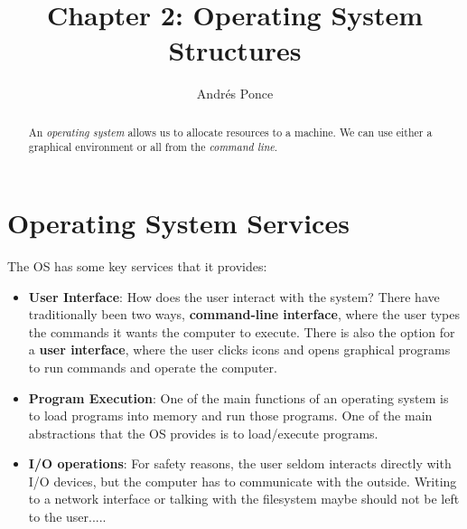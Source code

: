 \documentclass{tufte-handout}
\title{Chapter 2: Operating System Structures}
\author{Andr\'es Ponce}
\begin{document}
\maketitle
\begin{abstract}
	An \textit{operating system} allows us to allocate resources
	to a machine. We can use either a graphical environment or 
	all from the \textit{command line}.
\end{abstract}


\section{Operating System Services}
The OS has some key services that it provides:

\begin{itemize}
	\item \textbf{User Interface}: How does the user interact with the system? There 
			have traditionally been two ways, \textbf{command-line interface}, where the 
			user types the commands it wants the computer to execute. There is also the 
			option for a \textbf{user interface}, where the user clicks icons and opens
			graphical programs to run commands and operate the computer.

	\item \textbf{Program Execution}: One of the main functions of an operating system 
			is to load programs into memory and run those programs. One of the main 
			abstractions that the OS provides is to load/execute programs.

	\item \textbf{I/O operations}: For safety reasons, the user seldom interacts directly
			with I/O devices, but the computer has to communicate with the outside. 
			Writing to a network interface or talking with the filesystem maybe should not
			be left to the user.....
			
\end{itemize}
\end{document}
